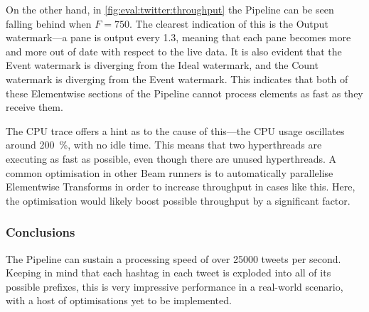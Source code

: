 On the other hand, in \cref{fig:eval:twitter:throughput} the Pipeline can be seen falling behind when $F = 750$.
The clearest indication of this is the Output watermark---a pane is output every \SI{1.3}{\min}, meaning that each pane becomes more and more out of date with respect to the live data.
It is also evident that the Event watermark is diverging from the Ideal watermark, and the Count watermark is diverging from the Event watermark.
This indicates that both of these Elementwise sections of the Pipeline cannot process elements as fast as they receive them.

The CPU trace offers a hint as to the cause of this---the CPU usage oscillates around \SI{200}{\percent}, with no idle time.
This means that two hyperthreads are executing as fast as possible, even though there are unused hyperthreads.
A common optimisation in other Beam runners is to automatically parallelise Elementwise Transforms in order to increase throughput in cases like this.
Here, the optimisation would likely boost possible throughput by a significant factor.

\subsubsection{Conclusions}

The Pipeline can sustain a processing speed of over \num{25000} tweets per second.
Keeping in mind that each hashtag in each tweet is exploded into all of its possible prefixes, this is very impressive performance in a real-world scenario, with a host of optimisations yet to be implemented.

